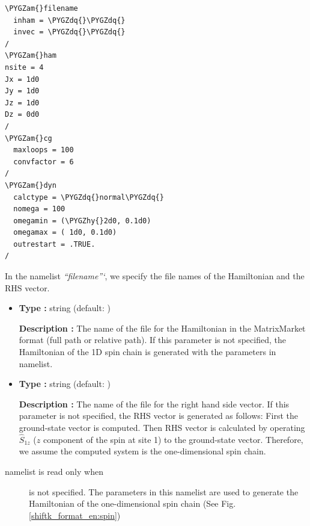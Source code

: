 \documentclass[letterpaper,10pt,dvipdfmx,openany]{sphinxmanual}
\def\PYGZam{\char`\&}
\def\PYGZhy{\char`\-}
\def\PYGZdq{\char`\"}
\begin{document}
\begin{Verbatim}[commandchars=\\\{\}]
\PYGZam{}filename
  inham = \PYGZdq{}\PYGZdq{}
  invec = \PYGZdq{}\PYGZdq{}
/
\PYGZam{}ham
nsite = 4
Jx = 1d0
Jy = 1d0
Jz = 1d0
Dz = 0d0
/
\PYGZam{}cg
  maxloops = 100
  convfactor = 6
/
\PYGZam{}dyn
  calctype = \PYGZdq{}normal\PYGZdq{}
  nomega = 100
  omegamin = (\PYGZhy{}2d0, 0.1d0)
  omegamax = ( 1d0, 0.1d0)
  outrestart = .TRUE.
/
\end{Verbatim}

In the namelist \emph{``filename''{}`}, we specify the file names of the
Hamiltonian and the RHS vector.
\begin{itemize}
\item {} 

\textbf{Type :} string (default: )

\textbf{Description :}
The name of the file for the Hamiltonian in the MatrixMarket format
(full path or relative path).
If this parameter is not specified,
the Hamiltonian of the 1D spin chain is generated
with the parameters in  namelist.

\item {} 

\textbf{Type :} string (default: )

\textbf{Description :}
The name of the file for the right hand side vector.
If this parameter is not specified,
the RHS vector is generated as follows:
First the ground-state vector is computed.
Then RHS vector is calculated by operating
\({\hat S}_{1 z}\) (\(z\) component of the spin at site 1)
to the ground-state vector.
Therefore, we assume the computed system is
the one-dimensional spin chain.

\end{itemize}
\begin{description}
\item[{ namelist is read only when}] \leavevmode
{} is not specified.
The parameters in this namelist are used to generate
the Hamiltonian of the one-dimensional spin chain (See Fig. \ref{shiftk_format_en:spin})

\end{description}
\end{document}
